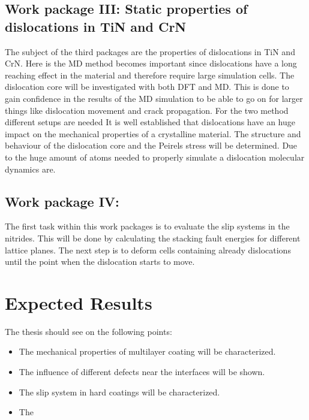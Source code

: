 \documentclass[12pt]{scrartcl}
\begin{document}
\subsection{Work package III: Static properties of dislocations in TiN and CrN}
The subject of the third packages are the properties of dislocations in TiN and CrN. Here is the MD method becomes important since dislocations have a long reaching effect in the material and therefore require large simulation cells. The dislocation core will be investigated with both DFT and MD. This is done to gain confidence in the results of the MD simulation to be able to go on for larger things like dislocation movement and crack propagation. 
For the two method different setups are needed  
It is well established that dislocations have an huge impact on the mechanical properties of a crystalline material. The structure and behaviour of the dislocation core and the Peirels stress will be determined. Due to the huge amount of atoms needed to properly simulate a dislocation molecular dynamics are.     

\subsection{Work package IV: }
The first task within this work packages is to evaluate the slip systems in the nitrides. This will be done by calculating the stacking fault energies for different lattice planes. The next step is to deform cells containing already dislocations until the point when the dislocation starts to move. 

\section{Expected Results}
The thesis should see on the following points:
\begin{itemize}
	\item The mechanical properties of multilayer coating will be characterized.
	\item The influence of different defects near the interfaces will be shown.
	\item The slip system in hard coatings will be characterized.
	\item The 
	
\end{itemize}

\medskip



\end{document}
